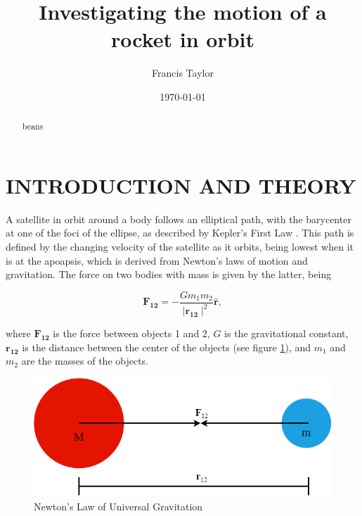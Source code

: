 \documentclass[twocolumn,prl,nobalancelastpage,aps,10pt]{revtex4-1}
\begin{document}
\title{Investigating the motion of a rocket in orbit}

\author{Francis Taylor}


\date{\today}

\begin{abstract} beans

\end{abstract}


\maketitle

\section{INTRODUCTION AND THEORY}

A satellite in orbit around a body follows an elliptical path, with the barycenter at one of the foci of the ellipse, as described by Kepler's First Law \cite{Kepler1992}. This path is defined by the changing velocity of the satellite as it orbits, being lowest when it is at the apoapsis,  which is derived from Newton's laws of motion and gravitation. The force on two bodies with mass is given by the latter, being \cite{Newton1848}

\begin{equation}\label{universalGravitation}
	\bm{F_{12}} = - \frac{G m_{1}m_{2}}{\mid\bm{r_{12}}\mid^{2}}\bm{\hat{r}} ,
\end{equation}

where $\bm{F_{12}}$ is the force between objects 1 and 2, $G$ is the gravitational constant, $\bm{r_{12}}$ is the distance between the center of the objects (see figure \ref{gravitationFigure}), and $m_{1}$ and $m_{2}$ are the masses of the objects.

\begin{figure}[h!]
\includegraphics*[width=0.96\linewidth,clip]{newtonGravitation}
\caption{Newton's Law of Universal Gravitation} \label{gravitationFigure}
\end{figure}
\end{document}
